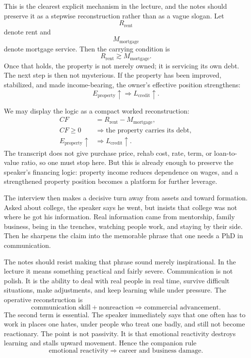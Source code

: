 This is the clearest explicit mechanism in the lecture, and the notes should preserve it as a stepwise reconstruction rather than as a vague slogan. Let
\[
R_{\text{rent}}
\]
denote rent and
\[
M_{\text{mortgage}}
\]
denote mortgage service. Then the carrying condition is
\begin{equation}
R_{\text{rent}} \gtrsim M_{\text{mortgage}}.
\end{equation}
Once that holds, the property is not merely owned; it is servicing its own debt. The next step is then not mysterious. If the property has been improved, stabilized, and made income-bearing, the owner's effective position strengthens:
\begin{equation}
E_{\text{property}} \uparrow \Rightarrow L_{\text{credit}} \uparrow.
\end{equation}

We may display the logic as a compact worked reconstruction:
\begin{align}
CF &= R_{\text{rent}} - M_{\text{mortgage}},\\
CF \ge 0 &\Rightarrow \text{the property carries its debt},\\
E_{\text{property}} \uparrow &\Rightarrow L_{\text{credit}} \uparrow.
\end{align}
The transcript does not give purchase price, rehab cost, rate, term, or loan-to-value ratio, so one must stop here. But this is already enough to preserve the speaker's financing logic: property income reduces dependence on wages, and a strengthened property position becomes a platform for further leverage.

The interview then makes a decisive turn away from assets and toward formation. Asked about college, the speaker says he went, but insists that college was not where he got his information. Real information came from mentorship, family business, being in the trenches, watching people work, and staying by their side. Then he sharpens the claim into the memorable phrase that one needs a PhD in communication.

The notes should resist making that phrase sound merely inspirational. In the lecture it means something practical and fairly severe. Communication is not polish. It is the ability to deal with real people in real time, survive difficult situations, make adjustments, and keep learning while under pressure. The operative reconstruction is
\begin{equation}
\text{communication skill} + \text{nonreaction} \Rightarrow \text{commercial advancement}.
\end{equation}
The second term is essential. The speaker immediately says that one often has to work in places one hates, under people who treat one badly, and still not become reactionary. The point is not passivity. It is that emotional reactivity destroys learning and stalls upward movement. Hence the companion rule
\begin{equation}
\text{emotional reactivity} \Rightarrow \text{career and business damage}.
\end{equation}

